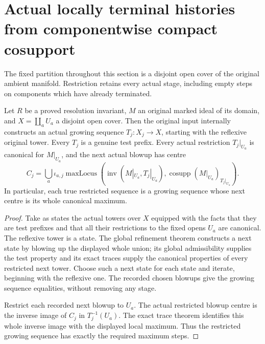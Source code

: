 \section{Actual locally terminal histories from componentwise compact cosupport}
\label{sec:hironaka-componentwise-canonical-history}

The fixed partition throughout this section is a disjoint open cover of
the original ambient manifold. Restriction retains every actual stage,
including empty steps on components which have already terminated.

\begin{theorem}
\label{hir:componentwise-canonical-growing-history}
\leanok
Let $R$ be a proved resolution invariant, $M$ an original marked ideal
of its domain, and $X=\coprod_aU_a$ a disjoint open cover. Then the
original input internally constructs an actual growing sequence
$T_j:X_j\to X$, starting with the reflexive original tower. Every
$T_j$ is a genuine test prefix. Every actual restriction $T_j|_{U_a}$
is canonical for $M|_{U_a}$, and the next actual blowup has centre
\[
 C_j=\bigcup_a\iota_{a,j}
 \operatorname{maxLocus}(\operatorname{inv}(M|_{U_a},T_j|_{U_a}),
                 \operatorname{cosupp}(M|_{U_a})_{T_j|_{U_a}}).
\]
In particular, each true restricted sequence is a growing sequence
whose next centre is its whole canonical maximum.
\end{theorem}
\begin{proof}
Take as states the actual towers over $X$ equipped with the facts
that they are test prefixes and that all their restrictions to
the fixed opens $U_a$ are canonical. The reflexive tower is a state.
The global refinement theorem constructs a next state by blowing
up the displayed whole union; its global admissibility supplies
the test property and its exact traces supply the canonical
properties of every restricted next tower. Choose such a next
state for each state and iterate, beginning with the reflexive
one. The recorded chosen blowups give the growing sequence
equalities, without removing any stage.

Restrict each recorded next blowup to $U_a$. The actual restricted
blowup centre is the inverse image of $C_j$ in $T_j^{-1}(U_a)$.
The exact trace theorem identifies this whole inverse image with
the displayed local maximum. Thus the restricted growing sequence
has exactly the required maximum steps.
\end{proof}

